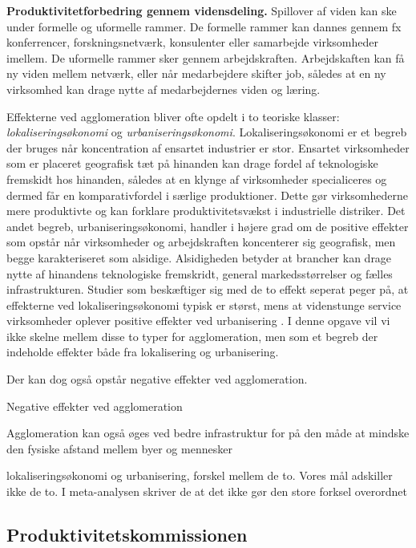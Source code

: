 \documentclass[a4paper, 12pt, titlepage]{article}
\begin{document}
\textbf{Produktivitetforbedring gennem vidensdeling.} Spillover af viden kan ske under formelle og uformelle rammer. De formelle rammer kan dannes gennem fx konferrencer, forskningsnetværk, konsulenter eller samarbejde virksomheder imellem. De uformelle rammer sker gennem arbejdskraften. Arbejdskaften kan få ny viden mellem netværk, eller når medarbejdere skifter job, således at en ny virksomhed kan drage nytte af medarbejdernes viden og læring. \cite{sorensen2014infrastruktur}  


Effekterne ved agglomeration bliver ofte opdelt i to teoriske klasser: \emph{lokaliseringsøkonomi} og \emph{urbaniseringsøkonomi}. Lokaliseringsøkonomi er et begreb der bruges når koncentration af ensartet industrier er stor. Ensartet virksomheder som er placeret geografisk tæt på hinanden kan drage fordel af teknologiske fremskidt hos hinanden, således at en klynge af virksomheder specialiceres og dermed får en komparativfordel i særlige produktioner. Dette gør virksomhederne mere produktivte og kan forklare produktivitetsvækst i industrielle distriker.  Det andet begreb, urbaniseringsøkonomi, handler i højere grad om de positive effekter som opstår når virksomheder og arbejdskraften koncenterer sig geografisk, men begge karakteriseret som alsidige. Alsidigheden betyder at brancher kan drage nytte af hinandens teknologiske fremskridt, general markedsstørrelser og fælles infrastrukturen. Studier som beskæftiger sig med de to effekt seperat peger på, at effekterne ved lokaliseringsøkonomi typisk er størst, mens at videnstunge service virksomheder oplever positive effekter ved urbanisering \cite{melo2009meta}. I denne opgave vil vi ikke skelne mellem disse to typer for agglomeration, men som et begreb der indeholde effekter både fra lokalisering og urbanisering.


Der kan dog også  opstår negative effekter ved agglomeration. 

Negative effekter ved agglomeration

Agglomeration kan også øges ved bedre infrastruktur for på den måde at mindske den fysiske afstand mellem byer og mennesker

lokaliseringsøkonomi og urbanisering, forskel mellem de to. Vores mål adskiller ikke de to. I meta-analysen skriver de at det ikke gør den store forksel overordnet


\subsection{Produktivitetskommissionen}
\end{document}
